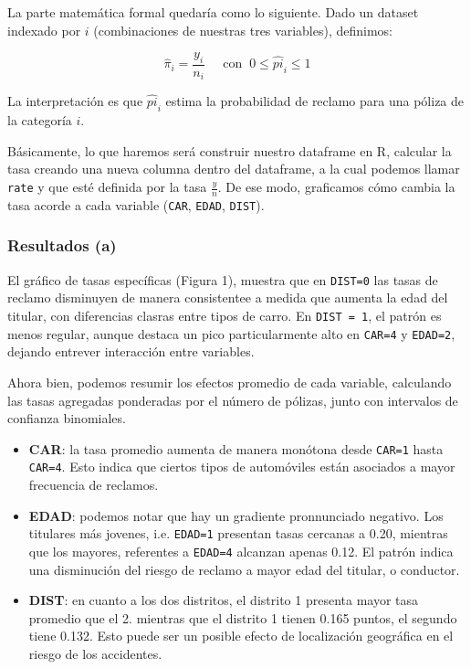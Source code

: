 La parte matemática formal quedaría como lo siguiente. Dado un dataset indexado por $i$ (combinaciones
de nuestras tres variables), definimos:

\[
    \hat{\pi}_i = \frac{y_i}{n_i} \;\;\;\;\; \text{con} \;\; 0 \leq \hat{pi}_i \leq 1
\]

La interpretación es que $\hat{pi}_i$ estima la probabilidad de reclamo para una póliza de la categoría $i$.

Básicamente, lo que haremos será construir nuestro dataframe en R, calcular la tasa creando una nueva
columna dentro del dataframe, a la cual podemos llamar \texttt{rate} y que esté definida por la tasa $\frac{y}{n}$.
De ese modo, graficamos cómo cambia la tasa acorde a cada variable (\texttt{CAR}, \texttt{EDAD}, \texttt{DIST}).

\subsubsection{Resultados (a)}

El gráfico de tasas específicas (Figura 1), muestra que en \texttt{DIST=0} las tasas de reclamo disminuyen
de manera consistentee a medida que aumenta la edad del titular, con diferencias clasras entre tipos de 
carro. En \texttt{DIST = 1}, el patrón es menos regular, aunque destaca un pico particularmente alto en 
\texttt{CAR=4} y \texttt{EDAD=2}, dejando entrever interacción entre variables. 

Ahora bien, podemos resumir los efectos promedio de cada variable, calculando las tasas agregadas ponderadas
por el número de pólizas, junto con intervalos de confianza binomiales. 

\begin{itemize}
    \item \textbf{CAR}: la tasa promedio aumenta de manera monótona desde \texttt{CAR=1} hasta \texttt{CAR=4}. 
    Esto indica que ciertos tipos de automóviles están asociados a mayor frecuencia de reclamos.
    \item \textbf{EDAD}: podemos notar que hay un gradiente pronnunciado negativo. Los titulares más jovenes,
    i.e. \texttt{EDAD=1} presentan tasas cercanas a 0.20, mientras que los mayores, referentes a \texttt{EDAD=4}
    alcanzan apenas 0.12. El patrón indica una disminución del riesgo de reclamo a mayor edad del titular, o conductor.
    \item \textbf{DIST}: en cuanto a los dos distritos, el distrito 1 presenta mayor tasa promedio que el 2. 
    mientras que el distrito 1 tienen 0.165 puntos, el segundo tiene 0.132. Esto puede ser un posible efecto
    de localización geográfica en el riesgo de los accidentes. 
\end{itemize}

